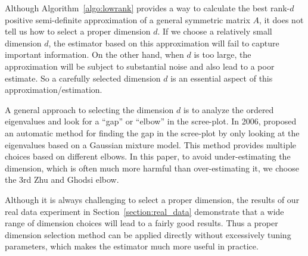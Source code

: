 \documentclass[a4paper]{article}
\begin{document}
Although Algorithm~\ref{algo:lowrank} provides a way to calculate the best rank-$d$ positive semi-definite approximation of a general symmetric matrix $A$, it does not tell us how to select a proper dimension $d$. If we choose a relatively small dimension $d$, the estimator based on this approximation will fail to capture important information. On the other hand, when $d$ is too large, the approximation will be subject to substantial noise and also lead to a poor estimate. So a carefully selected dimension $d$ is an essential aspect of this approximation/estimation.

A general approach to selecting the dimension $d$ is to analyze the ordered eigenvalues and look for a ``gap'' or ``elbow'' in the scree-plot.
In 2006, \citet{zhu2006automatic} proposed an automatic method for finding the gap in the scree-plot by only looking at the eigenvalues based on a Gaussian mixture model. This method provides multiple choices based on different elbows. In this paper, to avoid under-estimating the dimension, which is often much more harmful than over-estimating it, we choose the 3rd Zhu and Ghodsi elbow.

Although it is always challenging to select a proper dimension, the results of our real data experiment in Section~\ref{section:real_data} demonstrate that a wide range of dimension choices will lead to a fairly good results. Thus a proper dimension selection method can be applied directly without excessively tuning parameters, which makes the estimator much more useful in practice.
\end{document}
